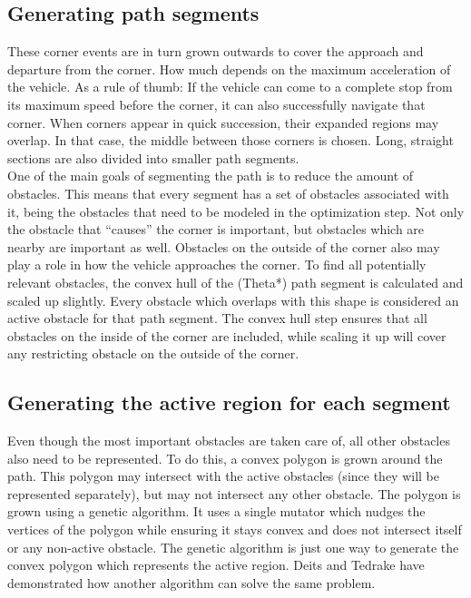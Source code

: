 \documentclass[12pt]{article}
\begin{document}
\subsection{Generating path segments}
These corner events are in turn grown outwards to cover the approach and departure from the corner. How much depends on the maximum acceleration of the vehicle. As a rule of thumb: If the vehicle can come to a complete stop from its maximum speed before the corner, it can also successfully navigate that corner. When corners appear in quick succession, their expanded regions may overlap. In that case, the middle between those corners is chosen. Long, straight sections are also divided into smaller path segments.\\
One of the main goals of segmenting the path is to reduce the amount of obstacles. This means that every segment has a set of obstacles associated with it, being the obstacles that need to be modeled in the optimization step. Not only the obstacle that ``causes'' the corner is important, but obstacles which are nearby are important as well. Obstacles on the outside of the corner also may play a role in how the vehicle approaches the corner. To find all potentially relevant obstacles, the convex hull of the (Theta*) path segment is calculated and scaled up slightly. Every obstacle which overlaps with this shape is considered an active obstacle for that path segment. The convex hull step ensures that all obstacles on the inside of the corner are included, while scaling it up will cover any restricting obstacle on the outside of the corner.
\subsection{Generating the active region for each segment}
Even though the most important obstacles are taken care of, all other obstacles also need to be represented. To do this, a convex polygon is grown around the path. This polygon may intersect with the active obstacles (since they will be represented separately), but may not intersect any other obstacle. The polygon is grown using a genetic algorithm. It uses a single mutator which nudges the vertices of the polygon while ensuring it stays convex and does not intersect itself or any non-active obstacle. The genetic algorithm is just one way to generate the convex polygon which represents the active region. Deits and Tedrake\cite{Deits2015} have demonstrated how another algorithm can solve the same problem.
\end{document}
